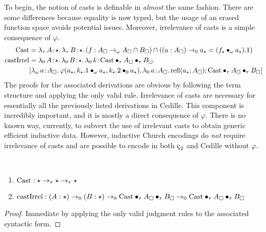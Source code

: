 To begin, the notion of casts is definable in \textit{almost} the same fashion.
There are some differences because equality is now typed, but the usage of an erased function space avoids potential issues.
Moreover, irrelevance of casts is a simple consequence of $\varphi$.
\begin{align*}
    \pCast &= \abs{\lambda_\tau}{A}{\star}{
        \abs{\lambda_\tau}{B}{\star}{
            (f : A_\square \to_\omega A_\square \cap B_\square)
            \cap ((a:A_\square) \to_0 a_\star = (\app{f_\star}{\omega}{a_\star}).1)
        }
    } \\
    \pcastIrrel &= \abs{\lambda_0}{A}{\star}{
        \abs{\lambda_0}{B}{\star}{
            \abs{\lambda_0}{k}{\apptwo{\pCast}{\tau}{A_\square}{\tau}{B_\square}}{
                \\ &[\abs{\lambda_\omega}{a}{A_\square}{
                    \varphi(a_\star, \app{k_\star.1}{\omega}{a_\star}, \app{k_\star.2}{0}{a_\star})
                }, \abs{\lambda_0}{a}{A_\square}{
                    \prefl(a_\star; A_\square)
                };
                \apptwo{\pCast}{\tau}{A_\square}{\tau}{B_\square}]
            }
        }
    }
\end{align*}
The proofs for the associated derivations are obvious by following the term structure and applying the only valid rule.
Irrelevance of casts are necessary for essentially all the previously listed derivations in Cedille.
This component is incredibly important, and it is mostly a direct consequence of $\varphi$.
There is no known way, currently, to subvert the use of irrelevant casts to obtain generic efficient inductive data.
However, inductive Church encodings do \textit{not} require irrelevance of casts and are possible to encode in both $\ced$ and Cedille without $\varphi$.
\begin{theorem}
    \label{lem:2:cast_derivations}
    \textcolor{white}{\_}
    \begin{enumerate}
        \item $\textnormal{Cast} : \star \to_\tau \star \to_\tau \star$
        \item $\textnormal{castIrrel} : (A:\star) \to_0 (B:\star) \to_0 \textnormal{Cast} \bullet_{\tau} A_\square \bullet_{\tau} B_\square \to_0 \textnormal{Cast} \bullet_{\tau} A_\square \bullet_{\tau} B_\square$
    \end{enumerate}
\end{theorem}
\begin{proof}
    Immediate by applying the only valid judgment rules to the associated syntactic form.
\end{proof}
